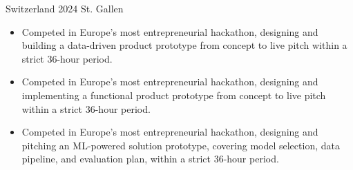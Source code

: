 {Switzerland}
{2024}
{St. Gallen}
{\footnotesize\faCode \hspace{1pt}
}

\begin{itemize}

    \ifde
        \item Competed in Europe's most entrepreneurial hackathon, designing and building a data-driven product prototype from concept to live pitch within a strict 36-hour period.
    \else
        \ifhpc
            \item Competed in Europe's most entrepreneurial hackathon, designing and implementing a functional product prototype from concept to live pitch within a strict 36-hour period.
        \else
            \item Competed in Europe's most entrepreneurial hackathon, designing and pitching an ML-powered solution prototype, covering model selection, data pipeline, and evaluation plan, within a strict 36-hour period.
        \fi
    \fi

\end{itemize}

\medskip
